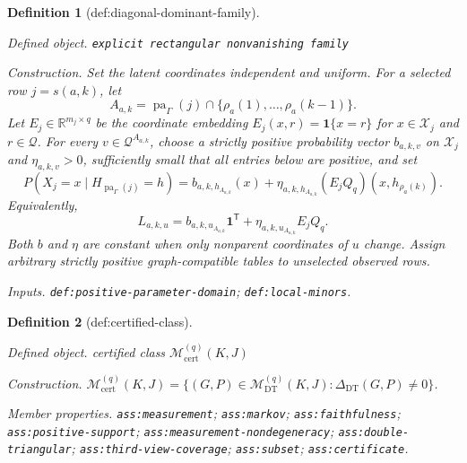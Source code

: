 \documentclass{article}
\newtheorem{definition}{Definition}
\begin{document}
\begin{definition}[def:diagonal-dominant-family]\label{def:diagonal-dominant-family}
\par\smallskip\noindent\emph{Defined object.} \texttt{explicit rectangular nonvanishing family}
\par\smallskip\noindent\emph{Construction.} Set the latent coordinates independent and uniform.  For a selected row \(j=s(a,k)\), let
\[
 A_{a,k}=\operatorname{pa}_{\Gamma}(j)
 \cap\{\rho_a(1),\ldots,\rho_a(k-1)\}.
\]
Let \(E_j\in\mathbb R^{m_j\times q}\) be the coordinate embedding \(E_j(x,r)=\mathbf1\{x=r\}\) for \(x\in\mathcal X_j\) and \(r\in\mathcal Q\).  For every \(v\in\mathcal Q^{A_{a,k}}\), choose a strictly positive probability vector \(b_{a,k,v}\) on \(\mathcal X_j\) and \(\eta_{a,k,v}>0\), sufficiently small that all entries below are positive, and set
\[
 P(X_j=x\mid H_{\operatorname{pa}_{\Gamma}(j)}=h)
 =b_{a,k,h_{A_{a,k}}}(x)
 +\eta_{a,k,h_{A_{a,k}}}
   \left(E_jQ_q\right)(x,h_{\rho_a(k)}).
\]
Equivalently,
\[
 L_{a,k,u}=b_{a,k,u_{A_{a,k}}}\mathbf1^{\mathsf T}
 +\eta_{a,k,u_{A_{a,k}}}E_jQ_q.
\]
Both \(b\) and \(\eta\) are constant when only nonparent coordinates of \(u\) change.  Assign arbitrary strictly positive graph-compatible tables to unselected observed rows.
\par\smallskip\noindent\emph{Inputs.} \texttt{def:\allowbreak{}positive-\allowbreak{}parameter-\allowbreak{}domain}; \texttt{def:\allowbreak{}local-\allowbreak{}minors}.
\end{definition}

\begin{definition}[def:certified-class]\label{def:certified-class}
\par\smallskip\noindent\emph{Defined object.} certified class \(\mathcal M_{\mathrm{cert}}^{(q)}(K,J)\)
\par\smallskip\noindent\emph{Construction.} \(\mathcal M_{\mathrm{cert}}^{(q)}(K,J)=\{(G,P)\in\mathcal M_{\mathrm{DT}}^{(q)}(K,J):\Delta_{\mathrm{DT}}(G,P)\neq0\}\).
\par\smallskip\noindent\emph{Member properties.} \texttt{ass:\allowbreak{}measurement}; \texttt{ass:\allowbreak{}markov}; \texttt{ass:\allowbreak{}faithfulness}; \texttt{ass:\allowbreak{}positive-\allowbreak{}support}; \texttt{ass:\allowbreak{}measurement-\allowbreak{}nondegeneracy}; \texttt{ass:\allowbreak{}double-\allowbreak{}triangular}; \texttt{ass:\allowbreak{}third-\allowbreak{}view-\allowbreak{}coverage}; \texttt{ass:\allowbreak{}subset}; \texttt{ass:\allowbreak{}certificate}.
\end{definition}
\end{document}
